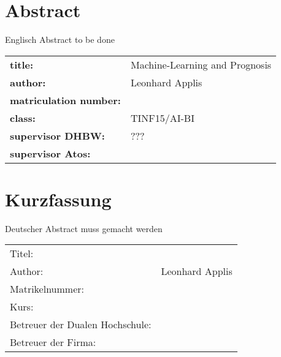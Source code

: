\chapter*{Abstract} %
Englisch Abstract to be done
~\newline
~\newline
\begin{flushleft}
	\begin{tabular}{ll}
		\textbf{title:} &\quad Machine-Learning and Prognosis \\
		\textbf{author:}  &\quad Leonhard Applis \\
		\textbf{matriculation number:} &\quad 2086307 \\
		\textbf{class:} &\quad TINF15/AI-BI \\
		\textbf{supervisor DHBW:} &\quad ??? \\
		\textbf{supervisor Atos:} & \quad \betreuerfirma \\
		[6ex]%
	\end{tabular} 
\end{flushleft}


\chapter*{Kurzfassung} 
Deutscher Abstract muss gemacht werden
~\newline
~\newline
\begin{flushleft}
	\begin{tabular}{ll}
		Titel:& \quad \titel \\ 
		Author:& \quad Leonhard Applis \\
		Matrikelnummer: & \quad \matrikelnr  \\
		Kurs: & \quad \kurs \\ 
		Betreuer der Dualen Hochschule: & \quad \betreuerdhbw \\ 
		Betreuer der Firma: & \quad \betreuerfirma \\
		[6ex]%
	\end{tabular} 
\end{flushleft}